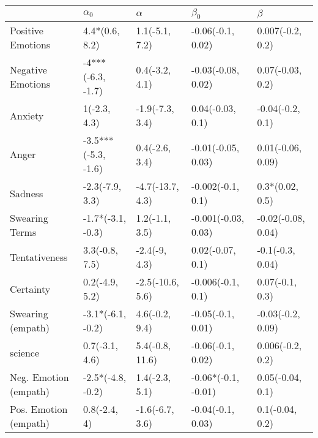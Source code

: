 \begin{tabular}{lllll}
\toprule
{} &           $\alpha_0$ &          $\alpha$ &            $\beta_0$ &             $\beta$ \\
\midrule
Positive Emotions     &       4.4*(0.6, 8.2) &    1.1(-5.1, 7.2) &    -0.06(-0.1, 0.02) &    0.007(-0.2, 0.2) \\
Negative Emotions     &    -4***(-6.3, -1.7) &    0.4(-3.2, 4.1) &   -0.03(-0.08, 0.02) &    0.07(-0.03, 0.2) \\
Anxiety               &         1(-2.3, 4.3) &   -1.9(-7.3, 3.4) &     0.04(-0.03, 0.1) &    -0.04(-0.2, 0.1) \\
Anger                 &  -3.5***(-5.3, -1.6) &    0.4(-2.6, 3.4) &   -0.01(-0.05, 0.03) &   0.01(-0.06, 0.09) \\
Sadness               &      -2.3(-7.9, 3.3) &  -4.7(-13.7, 4.3) &    -0.002(-0.1, 0.1) &     0.3*(0.02, 0.5) \\
Swearing Terms        &    -1.7*(-3.1, -0.3) &    1.2(-1.1, 3.5) &  -0.001(-0.03, 0.03) &  -0.02(-0.08, 0.04) \\
Tentativeness         &       3.3(-0.8, 7.5) &     -2.4(-9, 4.3) &     0.02(-0.07, 0.1) &    -0.1(-0.3, 0.04) \\
Certainty             &       0.2(-4.9, 5.2) &  -2.5(-10.6, 5.6) &    -0.006(-0.1, 0.1) &     0.07(-0.1, 0.3) \\
Swearing (empath)     &    -3.1*(-6.1, -0.2) &    4.6(-0.2, 9.4) &    -0.05(-0.1, 0.01) &   -0.03(-0.2, 0.09) \\
science               &       0.7(-3.1, 4.6) &   5.4(-0.8, 11.6) &    -0.06(-0.1, 0.02) &    0.006(-0.2, 0.2) \\
Neg. Emotion (empath) &    -2.5*(-4.8, -0.2) &    1.4(-2.3, 5.1) &  -0.06*(-0.1, -0.01) &    0.05(-0.04, 0.1) \\
Pos. Emotion (empath) &         0.8(-2.4, 4) &   -1.6(-6.7, 3.6) &    -0.04(-0.1, 0.03) &     0.1(-0.04, 0.2) \\
\bottomrule
\end{tabular}
